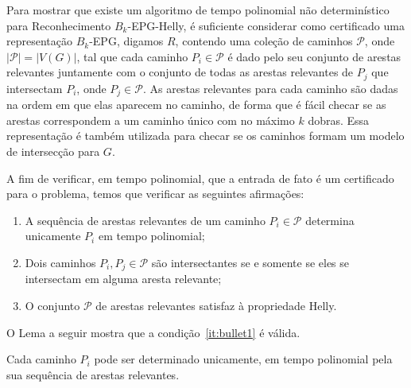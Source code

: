 Para mostrar que existe um algoritmo de tempo polinomial não determinístico para {\sc Reconhecimento $B_k$-EPG-Helly}, é suficiente considerar como certificado uma representação $B_k$-EPG, digamos  $R$, contendo uma coleção de caminhos  $\mathcal{P}$, onde $|\mathcal{P}| = |V(G)|$, tal que cada caminho   $P_i \in \mathcal{P}$  é dado pelo seu conjunto de arestas relevantes juntamente com o conjunto de todas as arestas relevantes de $P_j$ que intersectam $P_i$, onde $P_j \in \mathcal{P}$.  %
 As arestas relevantes para cada caminho são dadas na ordem em que elas aparecem no caminho, de forma que é fácil checar se as arestas correspondem a um caminho único com no máximo  $k$ dobras. Essa representação é também utilizada para checar se os caminhos formam um modelo de intersecção para  $G$.

A fim de verificar, em tempo polinomial, que a entrada de fato é um certificado para o problema, temos que verificar as seguintes afirmações:

\begin{enumerate}[label=(\roman*)]
\item A sequência de arestas relevantes de um caminho $P_i\in \mathcal{P}$ determina unicamente $P_i$ em tempo polinomial; \label{it:bullet1}

\item Dois caminhos  $P_i, P_j \in \mathcal{P}$ são intersectantes se e somente se eles se intersectam em alguma aresta relevante; \label{it:bullet2}

\item O conjunto  $\mathcal{P}$ de arestas relevantes satisfaz à propriedade Helly. \label{it:bullet3}
\end{enumerate}

O Lema a seguir mostra que a condição~\ref{it:bullet1} é válida.

\begin{lema}\label{lem:verify1}
Cada caminho $P_i$ pode ser determinado unicamente, em tempo polinomial pela sua sequência de arestas relevantes.
\end{lema}

